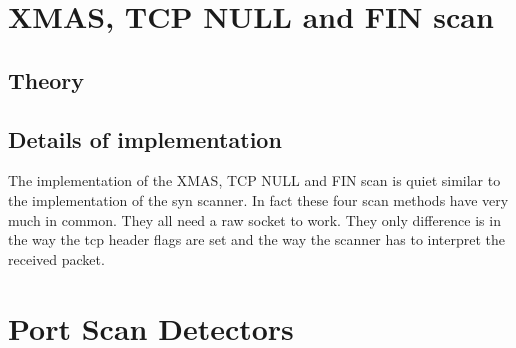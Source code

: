 \documentclass[a4paper]{scrartcl}
\begin{document}
	\section{XMAS, TCP NULL and FIN scan}
		\subsection{Theory}
		
		\subsection{Details of implementation}
		The implementation of the XMAS, TCP NULL and FIN scan is quiet similar to the implementation of the syn scanner. In fact these four scan methods have very much in common.
		They all need a raw socket to work. They only difference is in the way the tcp header flags are set and the way the scanner has to interpret the received packet.  
		
	\section{Port Scan Detectors}
	
	
	
	\newpage
	\printbibliography
\end{document}
